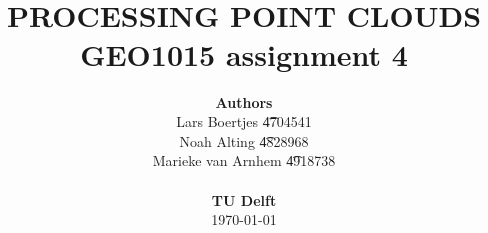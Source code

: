 \title{ \normalsize \textsc{}
		\\ [2.0cm]
		\HRule{1.5pt} \\
		\LARGE \textbf{\uppercase{Processing point clouds
}
		\HRule{2.0pt} \\ [0.6cm] \LARGE{GEO1015 assignment 4} \vspace*{10\baselineskip}}
		}
\date{}
\author{\textbf{Authors} \\ 
            Lars Boertjes \t 4704541 \\ 
		  Noah Alting \t 4828968 \\
            Marieke van Arnhem \t 4918738 \\ 
            \\
		\textbf{TU Delft} \\
		\today}

\maketitle
